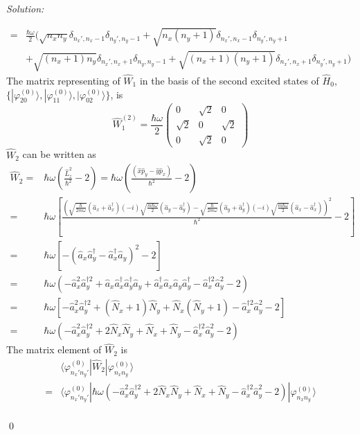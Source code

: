 \documentclass[10pt,a4paper]{article}
\newenvironment{sol}
    {\emph{Solution:}
    }
    {
    \qed
    }
\begin{document}
\begin{sol}
\begin{itemize}
\begin{align}
\nonumber=&\frac{\hbar\omega}{2}(\sqrt{n_xn_y}\delta_{n_x',n_x-1}\delta_{n_y',n_y-1}+\sqrt{n_x(n_y+1)}\delta_{n_x',n_x-1}\delta_{n_y',n_y+1}\\
\nonumber&+\sqrt{(n_x+1)n_y}\delta_{n_x',n_x+1}\delta_{n_y,n_y-1}+\sqrt{(n_x+1)(n_y+1)}\delta_{n_x',n_x+1}\delta_{n_y',n_y+1})
\end{align}
The matrix representing of $\hat{W}_1$ in the basis of the second excited states of $\hat{H}_0$, $\{|\varphi_{20}^{(0)}\rangle,|\varphi_{11}^{(0)}\rangle,|\varphi_{02}^{(0)}\rangle\}$, is
\begin{equation}
\hat{W}_1^{(2)}=\frac{\hbar\omega}{2}\left(\begin{array}{ccc}
0&\sqrt{2}&0\\
\sqrt{2}&0&\sqrt{2}\\
0&\sqrt{2}&0
\end{array}\right)
\end{equation}
$\hat{W}_2$ can be written as
\begin{align}
\nonumber\hat{W}_2=&\hbar\omega\left(\frac{\hat{L}_z^2}{\hbar^2}-2\right)=\hbar\omega\left(\frac{(\hat{x}\hat{p}_y-\hat{y}\hat{p}_x)}{\hbar^2}-2\right)\\
\nonumber=&\hbar\omega\left[\frac{\left(\sqrt{\frac{\hbar}{2m\omega}}(\hat{a}_x+\hat{a}_x^{\dagger})(-i)\sqrt{\frac{m\hbar\omega}{2}}(\hat{a}_y-\hat{a}_y^{\dagger})-\sqrt{\frac{\hbar}{2m\omega}}(\hat{a}_y+\hat{a}_y^{\dagger})(-i)\sqrt{\frac{m\hbar\omega}{2}}(\hat{a}_x-\hat{a}_x^{\dagger})\right)^2}{\hbar^2}-2\right]\\
\nonumber=&\hbar\omega[-(\hat{a}_x\hat{a}_y^{\dagger}-\hat{a}_x^{\dagger}\hat{a}_y)^2-2]\\
\nonumber=&\hbar\omega(-\hat{a}_x^2\hat{a}_y^{\dagger2}+\hat{a}_x\hat{a}_x^{\dagger}\hat{a}_y^{\dagger}\hat{a}_y+\hat{a}_x^{\dagger}\hat{a}_x\hat{a}_y\hat{a}_y^{\dagger}-\hat{a}_x^{\dagger2}\hat{a}_y^2-2)\\
\nonumber=&\hbar\omega[-\hat{a}_x^2\hat{a}_y^{\dagger2}+(\hat{N}_x+1)\hat{N}_y+\hat{N}_x(\hat{N}_y+1)-\hat{a}_x^{\dagger2}\hat{a}_y^2-2]\\
=&\hbar\omega(-\hat{a}_x^2\hat{a}_y^{\dagger2}+2\hat{N}_x\hat{N}_y+\hat{N}_x+\hat{N}_y-\hat{a}_x^{\dagger2}\hat{a}_y^2-2)
\end{align}
The matrix element of $\hat{W}_2$ is
\begin{align}
\nonumber&\langle\varphi_{n_x'n_y'}^{(0)}|\hat{W}_2|\varphi_{n_xn_y}^{(0)}\rangle\\
\nonumber=&\langle\varphi_{n_x'n_y'}^{(0)}|\hbar\omega(-\hat{a}_x^2\hat{a}_y^{\dagger2}+2\hat{N}_x\hat{N}_y+\hat{N}_x+\hat{N}_y-\hat{a}_x^{\dagger2}\hat{a}_y^2-2)|\varphi_{n_xn_y}^{(0)}\rangle\\

\end{align}
\end{itemize}
\end{sol}
\end{document}
